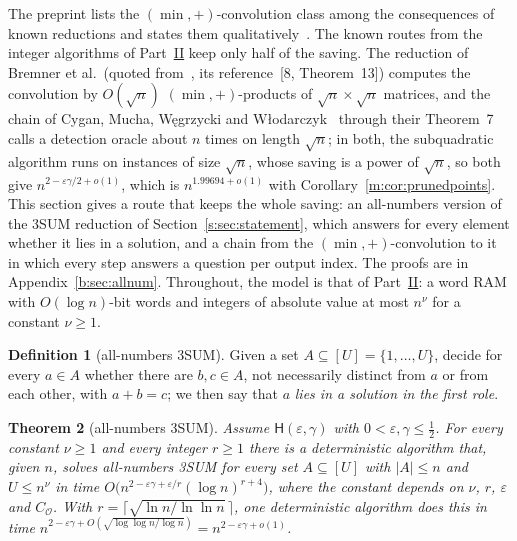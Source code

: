\documentclass[11pt]{article}
\newtheorem{theorem}{Theorem}[section]
\theoremstyle{definition}
\newtheorem{definition}[theorem]{Definition}
\theoremstyle{remark}
\newcommand{\Hyp}{\mathsf{H}}
\newcommand{\MinConvRoutesHalf}{1.99694}%
\begin{document}
The preprint lists the $(\min,+)$-convolution class among the consequences of known reductions and states them qualitatively~\cite[Section~1.2]{ZT}. The known routes from the integer algorithms of Part~\hyperref[m:partII]{II} keep only half of the saving. The reduction of Bremner et al.\ (quoted from~\cite{CMWW19}, its reference~[8, Theorem~13]) computes the convolution by $O(\sqrt n)$ $(\min,+)$-products of $\sqrt n\times\sqrt n$ matrices, and the chain of Cygan, Mucha, W\k{e}grzycki and W\l{}odarczyk~\cite{CMWW19} through their Theorem~7 calls a detection oracle about $n$ times on length $\sqrt n$; in both, the subquadratic algorithm runs on instances of size $\sqrt n$, whose saving is a power of $\sqrt n$, so both give $n^{2-\varepsilon\gamma/2+o(1)}$, which is $n^{\MinConvRoutesHalf+o(1)}$ with Corollary~\ref{m:cor:prunedpoints}. This section gives a route that keeps the whole saving: an all-numbers version of the 3SUM reduction of Section~\ref{s:sec:statement}, which answers for every element whether it lies in a solution, and a chain from the $(\min,+)$-convolution to it in which every step answers a question per output index. The proofs are in Appendix~\ref{b:sec:allnum}. Throughout, the model is that of Part~\hyperref[m:partII]{II}: a word RAM with $O(\log n)$-bit words and integers of absolute value at most $n^\nu$ for a constant $\nu\ge1$.

\begin{definition}[all-numbers 3SUM]
Given a set $A\subseteq[U]=\{1,\dots,U\}$, decide for every $a\in A$ whether there are $b,c\in A$, not necessarily distinct from $a$ or from each other, with $a+b=c$; we then say that $a$ \emph{lies in a solution in the first role}.
\end{definition}

\begin{theorem}[all-numbers 3SUM]\label{s:thm:allnum}
Assume $\Hyp(\varepsilon,\gamma)$ with $0<\varepsilon,\gamma\le\frac12$. For every constant $\nu\ge1$ and every integer $r\ge1$ there is a deterministic algorithm that, given $n$, solves all-numbers 3SUM for every set $A\subseteq[U]$ with $|A|\le n$ and $U\le n^\nu$ in time $O\big(n^{2-\varepsilon\gamma+\varepsilon/r}(\log n)^{r+4}\big)$, where the constant depends on $\nu$, $r$, $\varepsilon$ and $C_{\mathcal O}$. With $r=\lceil\sqrt{\ln n/\ln\ln n}\,\rceil$, one deterministic algorithm does this in time $n^{2-\varepsilon\gamma+O(\sqrt{\log\log n/\log n})}=n^{2-\varepsilon\gamma+o(1)}$.
\end{theorem}
\end{document}
